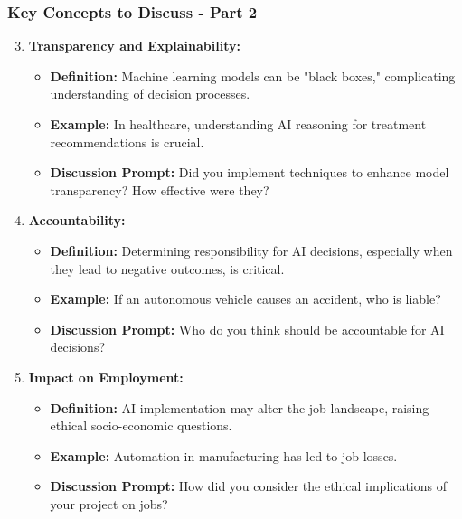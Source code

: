 \documentclass[aspectratio=169]{beamer}
\begin{document}
\begin{frame}[fragile]
    \frametitle{Key Concepts to Discuss - Part 2}
    
    \begin{enumerate}
        \setcounter{enumi}{2} %
        \item \textbf{Transparency and Explainability:}
        \begin{itemize}
            \item \textbf{Definition:} Machine learning models can be "black boxes," complicating understanding of decision processes.
            \item \textbf{Example:} In healthcare, understanding AI reasoning for treatment recommendations is crucial.
            \item \textbf{Discussion Prompt:} Did you implement techniques to enhance model transparency? How effective were they?
        \end{itemize}
        
        \item \textbf{Accountability:}
        \begin{itemize}
            \item \textbf{Definition:} Determining responsibility for AI decisions, especially when they lead to negative outcomes, is critical.
            \item \textbf{Example:} If an autonomous vehicle causes an accident, who is liable?
            \item \textbf{Discussion Prompt:} Who do you think should be accountable for AI decisions?
        \end{itemize}
        
        \item \textbf{Impact on Employment:}
        \begin{itemize}
            \item \textbf{Definition:} AI implementation may alter the job landscape, raising ethical socio-economic questions.
            \item \textbf{Example:} Automation in manufacturing has led to job losses.
            \item \textbf{Discussion Prompt:} How did you consider the ethical implications of your project on jobs?
        \end{itemize}
    \end{enumerate}
    
\end{frame}
\end{document}
